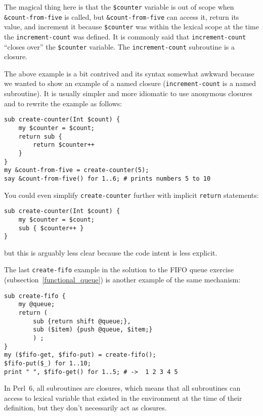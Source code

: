 The magical thing here is that the \verb'$counter' variable 
is out of scope when \verb'&count-from-five' is called, 
but \verb'&count-from-five' can access it, return its value, 
and increment it because \verb'$counter' was within the 
lexical scope at the time the {\tt increment-count} was 
defined. It is commonly said that {\tt increment-count} 
``closes over'' the \verb'$counter' variable. 
The {\tt increment-count} subroutine is a closure.

The above example is a bit contrived and its syntax 
somewhat awkward because we wanted to show an example 
of a named closure ({\tt increment-count} is a named 
subroutine). It is usually simpler and more idiomatic 
to use anonymous closures and to rewrite the example 
as follows:

\begin{verbatim}
sub create-counter(Int $count) {
    my $counter = $count;
    return sub {
        return $counter++
    }
}
my &count-from-five = create-counter(5);
say &count-from-five() for 1..6; # prints numbers 5 to 10
\end{verbatim}

You could even simplify {\tt create-counter} further 
with implicit {\tt return} statements:

\begin{verbatim}
sub create-counter(Int $count) {
    my $counter = $count;
    sub { $counter++ }
}
\end{verbatim}

but this is arguably less clear because the code intent 
is less explicit.

The last {\tt create-fifo} example in the solution to 
the FIFO queue exercise (subsection~\ref{functional_queue}) 
is another example of the same mechanism:

\begin{verbatim}
sub create-fifo {
    my @queue;
    return (
        sub {return shift @queue;}, 
        sub ($item) {push @queue, $item;}
        ) ;
}
my ($fifo-get, $fifo-put) = create-fifo();
$fifo-put($_) for 1..10;
print " ", $fifo-get() for 1..5; # ->  1 2 3 4 5
\end{verbatim}
%

In Perl~6, all subroutines are closures, which means that 
all subroutines can access to lexical variable that 
existed in the environment at the time of their definition, 
but they don't necessarily act as closures.

